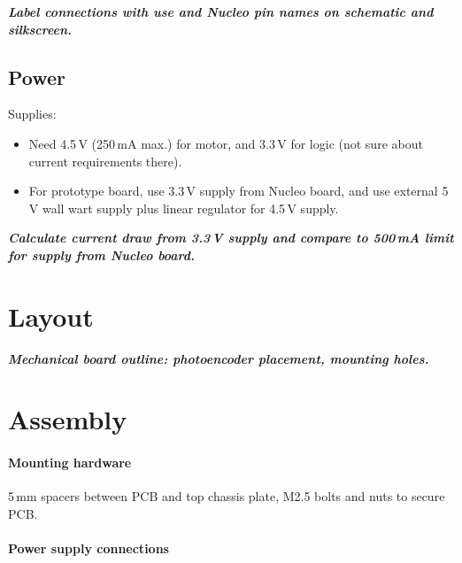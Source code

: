 \documentclass[a4paper,11pt,article]{memoir}
\newcommand{\todo}[1]{{\color{red}\textit{\textbf{#1}}}}
\begin{document}
\todo{Label connections with use and Nucleo pin names on schematic and
  silkscreen.}

\subsection*{Power}

Supplies:
\begin{itemize}
  \item{Need 4.5\,V (250\,mA max.) for motor, and 3.3\,V for logic
    (not sure about current requirements there).}
  \item{For prototype board, use 3.3\,V supply from Nucleo board, and
    use external 5\,V wall wart supply plus linear regulator for
    4.5\,V supply.}
\end{itemize}

\todo{Calculate current draw from 3.3\,V supply and compare to 500\,mA
limit for supply from Nucleo board.}


\section*{Layout}

\todo{Mechanical board outline: photoencoder placement, mounting
  holes.}


\section*{Assembly}

\paragraph{Mounting hardware}

5\,mm spacers between PCB and top chassis plate, M2.5 bolts and nuts
to secure PCB.

\paragraph{Power supply connections}
\end{document}

